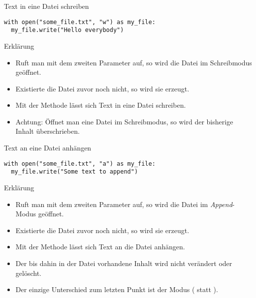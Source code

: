 \begin{fragile}
\begin{block}{Text in eine Datei schreiben}
\pause 
\vspace{2pt}

\begin{verbatim}
with open("some_file.txt", "w") as my_file:
  my_file.write("Hello everybody")
\end{verbatim}

\pause
\vspace{12pt}

\begin{exampleblock}{Erklärung}
\vspace{2pt}
\begin{itemize}[<+->]
\item Ruft man  mit dem zweiten Parameter  auf, so wird die Datei im Schreibmodus geöffnet. 
\item Existierte die Datei zuvor noch nicht, so wird sie erzeugt. 
\item Mit der Methode  lässt sich Text in eine Datei schreiben. 
\item Achtung: Öffnet man eine Datei im Schreibmodus, so wird der bisherige Inhalt überschrieben. 
\end{itemize}
\end{exampleblock}
\end{block}
\end{fragile}

\begin{fragile}
\begin{block}{Text an eine Datei anhängen}
\pause 
\vspace{2pt}

\begin{verbatim}
with open("some_file.txt", "a") as my_file:
  my_file.write("Some text to append")
\end{verbatim}

\pause
\vspace{12pt}

\begin{exampleblock}{Erklärung}
\vspace{2pt}
\begin{itemize}[<+->]
\item Ruft man  mit dem zweiten Parameter  auf, so wird die Datei im \emph{Append}-Modus geöffnet. 
\item Existierte die Datei zuvor noch nicht, so wird sie erzeugt. 
\item Mit der Methode  lässt sich Text an die Datei anhängen. 
\item Der bis dahin in der Datei vorhandene Inhalt wird nicht verändert oder gelöscht. 
\item Der einzige Unterschied zum letzten Punkt ist der Modus ( statt ).   
\end{itemize}
\end{exampleblock}
\end{block}

\end{fragile}

